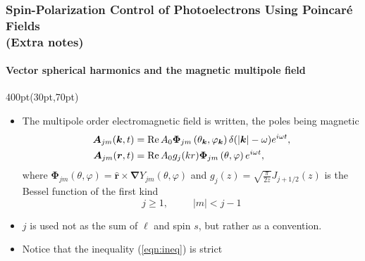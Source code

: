 \begin{frame}
\frametitle{Spin-Polarization Control of Photoelectrons
Using Poincar\'e Fields \\
\small (Extra notes)}
\framesubtitle{Vector spherical harmonics and the magnetic multipole field}


\footnotesize
\begin{textblock*}{400pt}(30pt,70pt)
\begin{itemize}
\item The multipole order electromagnetic field  is written, 
the poles being magnetic
\begin{align}
\boldsymbol{A}_{jm}(\boldsymbol{k},t) & = 
{\rm Re}\,A_0{\boldsymbol{\Phi}}_{jm}
\left( \theta_{\boldsymbol{k}},\varphi_{\boldsymbol{k}}\right)
\delta(|\boldsymbol{k}|-\omega)e^{i\omega t}, \\
\boldsymbol{A}_{jm}(\boldsymbol{r},t) & = 
{\rm Re}\,A_0 g_j(kr) {\boldsymbol{\Phi}}_{jm}
\left( \theta,\varphi\right) e^{i\omega t},
\end{align}
where ${\boldsymbol{\Phi}}_{jm}
\left( \theta,\varphi\right) =
\hat{\boldsymbol{r}}\times \boldsymbol{\nabla} Y_{jm}
\left( \theta,\varphi\right)$ 
and $g_j(z)=\sqrt{\frac{\pi}{2z}}J_{j+1/2}(z)$ 
is the Bessel function of the first kind
\begin{equation}
j\geqslant 1, \hspace{30pt} |m| < j-1 \label{eqn:ineq}
\end{equation}


\item $j$ is used not as the sum of $\ell$ and spin $s$, 
but rather as a convention.
\item Notice that the inequality (\ref{eqn:ineq}) is strict
\end{itemize}
\end{textblock*}
 
\end{frame}


